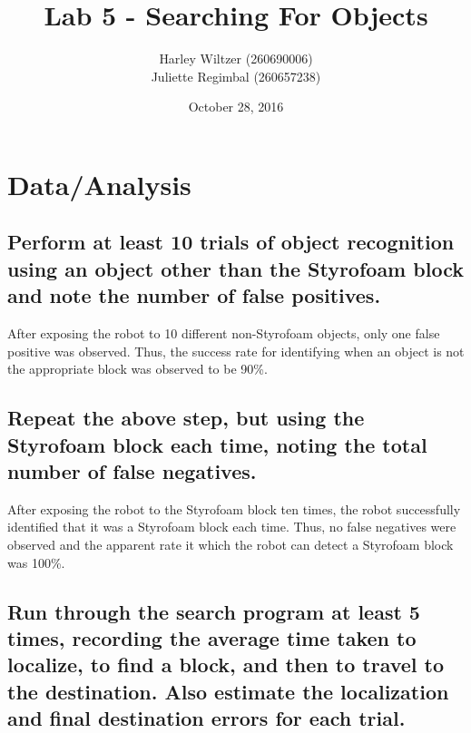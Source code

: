 \documentclass[10pt]{article}
\title{Lab 5 - Searching For Objects}
\author{Harley Wiltzer (260690006)\\Juliette Regimbal (260657238)}
\date{October 28, 2016}
\begin{document}
\maketitle
\section{Data/Analysis}
\subsection{Perform at least 10 trials of object recognition using an object other than the
Styrofoam block and note the number of false positives.}
After exposing the robot to 10 different non-Styrofoam objects, only one false positive was
observed. Thus, the success rate for identifying when an object is not the appropriate block was
observed to be 90\%.
\subsection{Repeat the above step, but using the Styrofoam block each time, noting the total number
of false negatives.}
After exposing the robot to the Styrofoam block ten times, the robot successfully identified that it
was a Styrofoam block each time. Thus, no false negatives were observed and the apparent rate it
which the robot can detect a Styrofoam block was 100\%.
\subsection{Run through the search program at least 5 times, recording the average time taken to
	localize, to find a block, and then to travel to the destination. Also estimate the localization
and final destination errors for each trial.}
\end{document}
